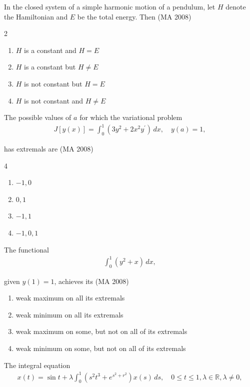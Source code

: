 \item
In the closed system of a simple harmonic motion of a pendulum, let $H$ denote the Hamiltonian and $E$ be the total energy. Then
\hfill (MA 2008)
\begin{multicols}{2}
\begin{enumerate}
    \item $H$ is a constant and $H = E$
    \item $H$ is a constant but $H \neq E$
    \item $H$ is not constant but $H = E$
    \item $H$ is not constant and $H \neq E$
\end{enumerate}
\end{multicols}

\item
The possible values of $a$ for which the variational problem
\begin{align}
    J[y(x)] = \int_0^1 (3y^2 + 2x^2 y^{\prime})\, dx, \quad y(a) = 1,
\end{align}

has extremals are
\hfill (MA 2008)
\begin{multicols}{4}
\begin{enumerate}
    \item $-1, 0$
    \item $0, 1$
    \item $-1, 1$
    \item $-1, 0, 1$
\end{enumerate}
\end{multicols}

\item
The functional 
\begin{align}
    \int_0^1 (y^2 + x) \, dx,
\end{align}

given $y(1) = 1$, achieves its
\hfill (MA 2008)

\begin{enumerate}
    \item weak maximum on all its extremals
    \item weak minimum on all its extremals
    \item weak maximum on some, but not on all of its extremals
    \item weak minimum on some, but not on all of its extremals
\end{enumerate}


\item
The integral equation
\begin{align}
    x(t) = \sin t + \lambda \int_0^1 (s^2 t^3 + e^{s^2 + r^2}) x(s) \, ds, \quad 0 \leq t \leq 1, \lambda \in \mathbb{R}, \lambda \neq 0,
\end{align}

